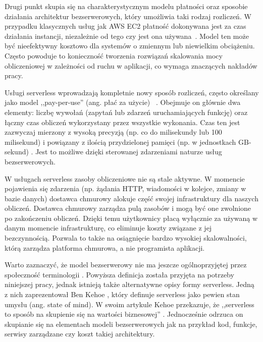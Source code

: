 Drugi punkt skupia się na charakterystycznym modelu płatności oraz sposobie działania architektur bezserwerowych, który umożliwia taki rodzaj rozliczeń. 
W przypadku klasycznych usług jak AWS EC2 płatność dokonywana jest za czas działania instancji, niezależnie od tego czy jest ona używana~\cite{awsEc2Guide}. 
Model ten może być nieefektywny kosztowo dla systemów o zmiennym lub niewielkim obciążeniu. 
Często powoduje to konieczność tworzenia rozwiązań skalowania mocy obliczeniowej w zależności od ruchu w aplikacji, co wymaga znaczących nakładów pracy.

Usługi serverless wprowadzają kompletnie nowy sposób rozliczeń, często określany jako model ,,pay-per-use'' (ang. płać za użycie) ~\cite{ServerlessApplicationsWhyWhenAndHow}.
Obejmuje on głównie dwa elementy: liczbę wywołań (zapytań lub zdarzeń uruchamiających funkcję) oraz łączny czas obliczeń wykorzystany przez wszystkie wykonania. 
Czas ten jest zazwyczaj mierzony z wysoką precyzją (np. co do milisekundy lub 100 milisekund) i powiązany z ilością przydzielonej pamięci (np. w jednostkach GB-sekund) \cite{awsLambdaDocs}.
Jest to możliwe dzięki sterowanej zdarzeniami naturze usług bezserwerowych.

W usługach serverless zasoby obliczeniowe nie są stale aktywne. 
W momencie pojawienia się zdarzenia (np. żądania HTTP, wiadomości w kolejce, zmiany w bazie danych) dostawca chmurowy alokuje część swojej infrastruktury dla naszych obliczeń.
Dostawca chmurowy zarządza pulą zasobów i mogą być one zwolnione po zakończeniu obliczeń.
Dzięki temu użytkownicy płacą wyłącznie za używaną w danym momencie infrastrukturę, co eliminuje koszty związane z jej bezczynnością.
Pozwala to także na osiągnięcie bardzo wysokiej skalowalności, którą zarządza platforma chmurowa, a nie programista aplikacji.

Warto zaznaczyć, że model bezserwerowy nie ma jeszcze ogólnoprzyjętej przez społeczność terminologii \cite{SpecRgCloudGroupVisionOnThePerformanceChallengesOfFaas}.
Powyższa definicja została przyjęta na potrzeby niniejszej pracy, jednak istnieją także alternatywne opisy formy serverless.
Jedną z nich zaprezentował Ben Kehoe \cite{kehoe_serverless_2018}, który definuje serverless jako pewien stan umysłu (ang. state of mind).
W swoim artykule Kehoe przekazuje, że ,,serverless to sposób na skupienie się na wartości biznesowej'' \cite{kehoe_serverless_2018}.
Jednocześnie odrzuca on skupianie się na elementach modeli bezserwerowych jak na przykład kod, funkcje, serwisy zarządzane czy koszt takiej architektury.

